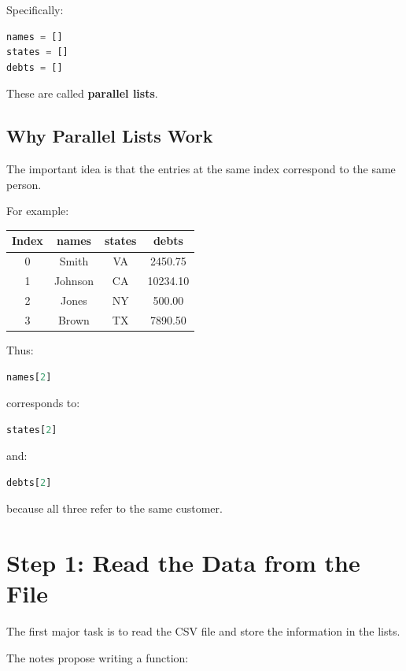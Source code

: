 \documentclass[11pt]{article}
\begin{document}
Specifically:

\begin{lstlisting}[language=Python]
names = []
states = []
debts = []
\end{lstlisting}

These are called \textbf{parallel lists}.

\subsection{Why Parallel Lists Work}

The important idea is that the entries at the same index correspond to the same person.

For example:

\begin{center}
\begin{tabular}{cccc}
\toprule
Index & names & states & debts \\
\midrule
0 & Smith & VA & 2450.75 \\
1 & Johnson & CA & 10234.10 \\
2 & Jones & NY & 500.00 \\
3 & Brown & TX & 7890.50 \\
\bottomrule
\end{tabular}
\end{center}

Thus:

\begin{lstlisting}[language=Python]
names[2]
\end{lstlisting}

corresponds to:

\begin{lstlisting}[language=Python]
states[2]
\end{lstlisting}

and:

\begin{lstlisting}[language=Python]
debts[2]
\end{lstlisting}

because all three refer to the same customer.

\section{Step 1: Read the Data from the File}

The first major task is to read the CSV file and store the information in the lists.

The notes propose writing a function:
\end{document}

